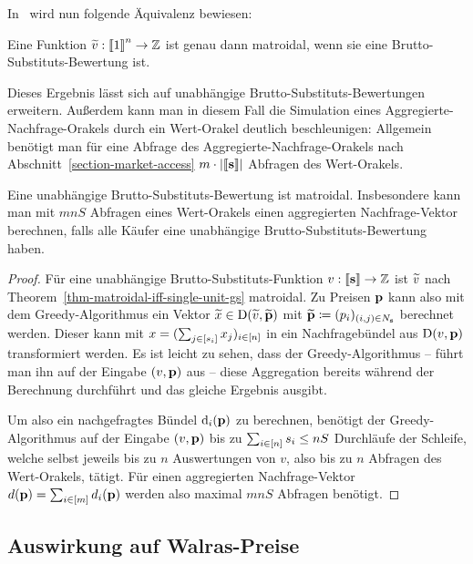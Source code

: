 In~\cite[Theorem~3.2]{PaesLeme2017} wird nun folgende Äquivalenz bewiesen:
\begin{theorem}\label{thm-matroidal-iff-single-unit-gs}
	Eine Funktion $\widetilde{v}:\left\llbracket 1 \right\rrbracket^n \rightarrow \mathbb{Z}$ ist genau dann matroidal, wenn sie eine Brutto-Substituts-Bewertung ist.
\end{theorem}
Dieses Ergebnis lässt sich auf unabhängige Brutto-Substituts-Bewertungen erweitern.
Außerdem kann man in diesem Fall die Simulation eines Aggregierte-Nachfrage-Orakels durch ein Wert-Orakel deutlich beschleunigen:
Allgemein benötigt man für eine Abfrage des Aggregierte-Nachfrage-Orakels nach Abschnitt~\ref{section-market-access} $m\cdot\left\lvert \left\llbracket \mathbf{s} \right\rrbracket \right\rvert$ Abfragen des Wert-Orakels.
\begin{korollar}\label{cor-indep-gs-matroidal}
	Eine unabhängige Brutto-Substituts-Bewertung ist matroidal.
	Insbesondere kann man mit $mnS$ Abfragen eines Wert-Orakels einen aggregierten  Nachfrage-Vektor berechnen, falls alle Käufer eine unabhängige Brutto-Substituts-Bewertung haben.
\end{korollar}
\begin{proof}
	Für eine unabhängige Brutto-Substituts-Funktion $v:\left\llbracket \mathbf{s} \right\rrbracket \rightarrow \mathbb{Z}$ ist $\widetilde{v}$ nach Theorem~\ref{thm-matroidal-iff-single-unit-gs} matroidal.
	Zu Preisen $\mathbf{p}$ kann also mit dem Greedy-Algorithmus ein Vektor $\widetilde{x}\in\operatorname{D}(\widetilde{v}, \widetilde{\mathbf{p}})$ mit $\widetilde{\mathbf{p}} \coloneqq (p_i)_{(i,j)\in N_{\mathbf{s}}}$ berechnet werden.
	Dieser kann mit $x=(\sum_{j\in\left[ s_i \right]} x_j)_{i\in\left[ n \right]}$ in ein Nachfragebündel aus $\operatorname{D}(v, \mathbf{p})$ transformiert werden.
	Es ist leicht zu sehen, dass der Greedy-Algorithmus -- führt man ihn auf der Eingabe $(v,\mathbf{p})$ aus -- diese Aggregation bereits während der Berechnung durchführt und das gleiche Ergebnis ausgibt.
	
	Um also ein nachgefragtes Bündel $\operatorname{d}_i(\mathbf{p})$ zu berechnen, benötigt der Greedy-Algorithmus auf der Eingabe $(v, \mathbf{p})$ bis zu $\sum_{i\in\left[ n \right]} s_i \leq nS$ Durchläufe der Schleife, welche selbst jeweils bis zu $n$ Auswertungen von $v$, also bis zu $n$ Abfragen des Wert-Orakels, tätigt.
	Für einen aggregierten Nachfrage-Vektor $d(\mathbf{p}) = \sum_{i\in\left[ m \right]} d_i(\mathbf{p})$ werden also maximal $mnS$ Abfragen benötigt.
\end{proof}


\subsection{Auswirkung auf Walras-Preise}

